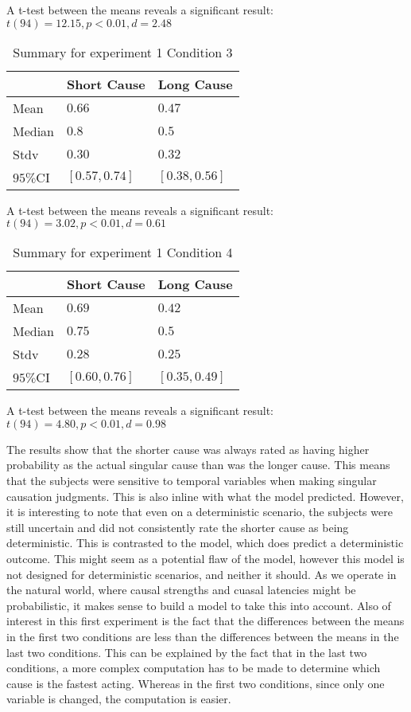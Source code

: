 \documentclass[10pt,letterpaper]{article}
\begin{document}
A t-test between the means reveals a significant result: $t(94) = 12.15, p < 0.01, d = 2.48$
\begin{table}[H]
\begin{center} 
\caption{Summary for experiment 1 Condition 3} 
\label{summary exp1} 
\vskip 0.12in
\begin{tabular}{lll} 
\toprule
& Short Cause &  Long Cause\\
\midrule
	Mean & $0.66$ & $0.47$  \\
	Median & $0.8$ & $0.5$  \\
	Stdv & $0.30$ & $0.32$  \\
	$95\%$CI & $[0.57, 0.74]$ &  $[0.38, 0.56]$ \\
\bottomrule
\end{tabular} 
\end{center} 
\end{table}
A t-test between the means reveals a significant result: $t(94) = 3.02, p < 0.01, d = 0.61$
\begin{table}[H]
\begin{center} 
\caption{Summary for experiment 1 Condition 4} 
\label{summary exp1} 
\vskip 0.12in
\begin{tabular}{lll} 
\toprule
& Short Cause &  Long Cause\\
\midrule
	Mean & $0.69$ & $0.42$  \\
	Median & $0.75$ & $0.5$  \\
	Stdv & $0.28$ & $0.25$  \\
	$95\%$CI & $[0.60, 0.76]$ & $[0.35, 0.49]$ \\
\bottomrule
\end{tabular} 
\end{center} 
\end{table}
A t-test between the means reveals a significant result: $t(94) = 4.80, p < 0.01, d = 0.98$

The results show that the shorter cause was always rated as having higher probability as the actual singular cause than was
the longer cause. This means that the subjects were sensitive to temporal variables when making singular causation judgments.
This is also inline with what the model predicted. However, it is interesting to note that even on a deterministic scenario, the subjects were still uncertain and did not consistently rate the shorter cause as being deterministic. This is contrasted to the model, which does predict a deterministic outcome. This might seem as a potential flaw of the model, however this model is not designed for deterministic scenarios,
and neither it should. As we operate in the natural world, where causal strengths and cuasal latencies might be probabilistic, it makes sense
to build a model to take this into account. Also of interest in this first experiment is the fact that the differences between the means in the first two conditions are less than the differences between the means in the last two conditions. This can be explained by the fact that in
the last two conditions, a more complex computation has to be made to determine which cause is the fastest acting. Whereas in the first 
two conditions, since only one variable is changed, the computation is easier.
\end{document}
